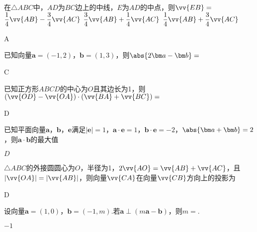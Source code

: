 \begin{exercise}
      在$\triangle{ABC}$中，$AD$为$BC$边上的中线，$E$为$AD$的中点，则$\vv{EB}=$\xz
       {$\dfrac14 \vv{AB}-\dfrac34 \vv{AC}$}
       {$\dfrac34 \vv{AB}+\dfrac14 \vv{AC}$}
       {$\dfrac14 \vv{AB}+\dfrac34 \vv{AC}$}
      \begin{answer}
        A
      \end{answer}
    \item %
      已知向量$\bm a=(-1,2)$，$\bm b=(1,3)$，则$\abs{2\bm a-\bm b}=$\xz
      \begin{answer}
        C
      \end{answer}
    \item %
      已知正方形$ABCD$的中心为$O$且其边长为1，则$(\vv{OD}-\vv{OA})\cdot(\vv{BA}+\vv{BC})=$\xz
      \begin{answer}
        D
      \end{answer}
    \item %
      已知平面向量$\bm a$，$\bm b$，$\bm e$满足$|\bm e|=1$，$\bm a\cdot\bm e=1$，$\bm b\cdot\bm e=-2$，$\abs{\bm a+\bm b}=2$，则$\bm a\cdot \bm b$的最大值\xz
      \begin{answer}
        $D$
      \end{answer}
    \item %
      $\triangle{ABC}$的外接圆圆心为$O$，半径为1，$2\vv{AO}=\vv{AB}+\vv{AC}$，且$|\vv{OA}|=|\vv{AB}|$，则向量$\vv{CA}$在向量$\vv{CB}$方向上的投影为\xz
      \begin{answer}
        D
      \end{answer}

    \item %
      设向量$\bm a=(1,0)$，$\bm b=(-1,m)$.若$\bm a\perp(m\bm a-\bm b)$，则$m=$\tk.
      \begin{answer}
        $-1$
      \end{answer}
  \end{exercise}
    \clearpage
\newpage
